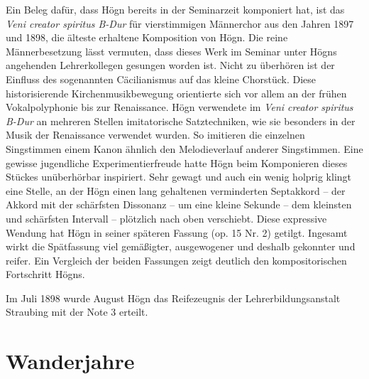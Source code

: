 \documentclass{book}
\begin{document}
Ein Beleg dafür, dass Högn bereits in der Seminarzeit komponiert hat,
ist das \textit{Veni creator spiritus B-Dur} für vierstimmigen
Männerchor aus den Jahren 1897 und 1898, die älteste erhaltene
Komposition von Högn. Die reine Männerbesetzung lässt vermuten, dass
dieses Werk im Seminar unter Högns angehenden Lehrerkollegen gesungen
worden ist. Nicht zu überhören ist der Ein\-fluss des sogenannten
Cäcilianismus auf das kleine Chorstück. Diese historisierende
Kirchenmusikbewegung orientierte sich vor allem an der frühen
Vokalpolyphonie bis zur Renaissance. Högn verwendete im \textit{Veni
creator spiritus B-Dur} an mehreren Stellen imitatorische
Satztechniken, wie sie besonders in der Musik der Renaissance verwendet
wurden. So imitieren die einzelnen Singstimmen einem Kanon ähnlich den
Melodieverlauf anderer Singstimmen. Eine gewisse jugendliche
Experimentierfreude hatte Högn beim Komponieren dieses Stückes
unüberhörbar inspiriert. Sehr gewagt und auch ein wenig holprig klingt
eine Stelle, an der Högn einen lang gehaltenen verminderten Septakkord
– der Akkord mit der schärfsten Dissonanz – um eine kleine Sekunde –
dem kleinsten und schärfsten Intervall – plötzlich nach oben
verschiebt. Diese expressive Wendung hat Högn in seiner späteren
Fassung (op. 15 Nr. 2) getilgt. Ingesamt wirkt die Spätfassung viel
gemäßigter, ausgewo\-gener und deshalb gekonnter und reifer. Ein
Vergleich der beiden Fassungen zeigt deutlich den kompositorischen
Fortschritt Högns. 

Im Juli 1898 wurde August Högn das Reifezeugnis der
Lehrerbildungsan\-stalt Straubing mit der Note 3 erteilt.

\section{Wanderjahre}
\end{document}
